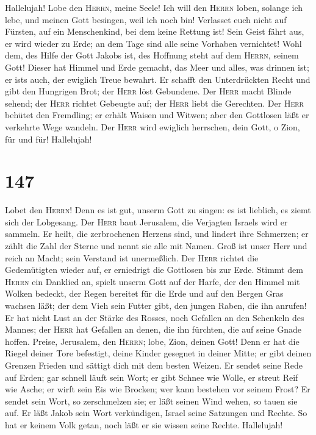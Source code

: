  Hallelujah! Lobe den \textsc{Herrn}, meine Seele!
 Ich will den \textsc{Herrn} loben, solange ich lebe, und
meinen Gott besingen, weil ich noch bin!  Verlasset euch
nicht auf Fürsten, auf ein Menschenkind, bei dem keine Rettung ist!
 Sein Geist fährt aus, er wird wieder zu Erde; an dem Tage
sind alle seine Vorhaben vernichtet!  Wohl dem, des Hilfe
der Gott Jakobs ist, des Hoffnung steht auf dem \textsc{Herrn}, seinem
Gott!  Dieser hat Himmel und Erde gemacht, das Meer und
alles, was drinnen ist; er ist\textquotesingle s auch, der ewiglich
Treue bewahrt.  Er schafft den Unterdrückten Recht und
gibt den Hungrigen Brot; der \textsc{Herr} löst Gebundene.
 Der \textsc{Herr} macht Blinde sehend; der \textsc{Herr}
richtet Gebeugte auf; der \textsc{Herr} liebt die Gerechten.
 Der \textsc{Herr} behütet den Fremdling; er erhält Waisen
und Witwen; aber den Gottlosen läßt er verkehrte Wege wandeln.
 Der \textsc{Herr} wird ewiglich herrschen, dein Gott, o
Zion, für und für! Hallelujah!

\hypertarget{section-146}{%
\section{147}\label{section-146}}

 Lobet den \textsc{Herrn}! Denn es ist gut, unserm Gott zu
singen: es ist lieblich, es ziemt sich der Lobgesang.  Der
\textsc{Herr} baut Jerusalem, die Verjagten Israels wird er sammeln.
 Er heilt, die zerbrochenen Herzens sind, und lindert ihre
Schmerzen;  er zählt die Zahl der Sterne und nennt sie
alle mit Namen.  Groß ist unser Herr und reich an Macht;
sein Verstand ist unermeßlich.  Der \textsc{Herr} richtet
die Gedemütigten wieder auf, er erniedrigt die Gottlosen bis zur Erde.
 Stimmt dem \textsc{Herrn} ein Danklied an, spielt unserm
Gott auf der Harfe,  der den Himmel mit Wolken bedeckt,
der Regen bereitet für die Erde und auf den Bergen Gras wachsen läßt;
 der dem Vieh sein Futter gibt, den jungen Raben, die ihn
anrufen!  Er hat nicht Lust an der Stärke des Rosses,
noch Gefallen an den Schenkeln des Mannes;  der
\textsc{Herr} hat Gefallen an denen, die ihn fürchten, die auf seine
Gnade hoffen.  Preise, Jerusalem, den \textsc{Herrn};
lobe, Zion, deinen Gott!  Denn er hat die Riegel deiner
Tore befestigt, deine Kinder gesegnet in deiner Mitte; 
er gibt deinen Grenzen Frieden und sättigt dich mit dem besten Weizen.
 Er sendet seine Rede auf Erden; gar schnell läuft sein
Wort;  er gibt Schnee wie Wolle, er streut Reif wie
Asche;  er wirft sein Eis wie Brocken; wer kann bestehen
vor seinem Frost?  Er sendet sein Wort, so zerschmelzen
sie; er läßt seinen Wind wehen, so tauen sie auf.  Er
läßt Jakob sein Wort verkündigen, Israel seine Satzungen und Rechte.
 So hat er keinem Volk getan, noch läßt er sie wissen
seine Rechte. Hallelujah!

